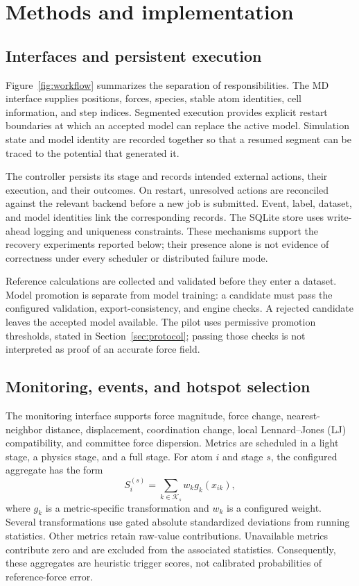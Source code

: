 \section{Methods and implementation}
\subsection{Interfaces and persistent execution}
Figure~\ref{fig:workflow} summarizes the separation of responsibilities.
The MD interface supplies positions, forces, species, stable atom identities,
cell information, and step indices. Segmented execution provides explicit
restart boundaries at which an accepted model can replace the active model.
Simulation state and model identity are recorded together so that a resumed
segment can be traced to the potential that generated it.

The controller persists its stage and records intended external actions,
their execution, and their outcomes. On restart, unresolved actions are
reconciled against the relevant backend before a new job is submitted.
Event, label, dataset, and model identities link the corresponding records.
The SQLite store uses write-ahead logging and uniqueness constraints.
These mechanisms support the recovery experiments reported below; their
presence alone is not evidence of correctness under every scheduler or
distributed failure mode.

Reference calculations are collected and validated before they enter a
dataset. Model promotion is separate from model training: a candidate must
pass the configured validation, export-consistency, and engine checks.
A rejected candidate leaves the accepted model available. The pilot uses
permissive promotion thresholds, stated in Section~\ref{sec:protocol};
passing those checks is not interpreted as proof of an accurate force field.

\subsection{Monitoring, events, and hotspot selection}
The monitoring interface supports force magnitude, force change,
nearest-neighbor distance, displacement, coordination change, local
Lennard--Jones (LJ) compatibility, and committee force dispersion.
Metrics are scheduled in a light stage, a physics stage, and a full stage.
For atom $i$ and stage $s$, the configured aggregate has the form
\begin{equation}
 S_i^{(s)}=\sum_{k\in\mathcal{K}_s}w_k g_k(x_{ik}),
 \label{eq:score}
\end{equation}
where $g_k$ is a metric-specific transformation and $w_k$ is a configured
weight. Several transformations use gated absolute standardized deviations
from running statistics. Other metrics retain raw-value contributions.
Unavailable metrics contribute zero and are excluded from the associated
statistics. Consequently, these aggregates are heuristic trigger scores,
not calibrated probabilities of reference-force error.

